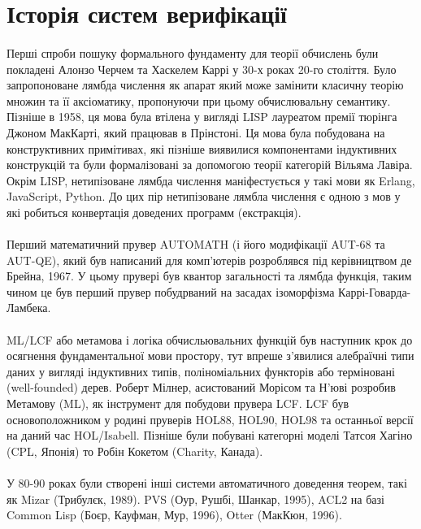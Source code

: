 \section{Історія систем верифікації}

\paragraph{}
Перші спроби пошуку формального фундаменту для теорії обчислень були покладені
Алонзо Черчем та Хаскелем Каррі у 30-х роках 20-го століття. Було запропоноване
лямбда числення як апарат який може замінити класичну теорію множин та її аксіоматику,
пропонуючи при цьому обчислювальну семантику. Пізніше в 1958, ця мова була втілена
у вигляді LISP лауреатом премії тюрінга Джоном МакКарті, який працював в Прінстоні.
Ця мова була побудована на конструктивних примітивах, які пізніше виявилися компонентами
індуктивних конструкцій та були формалізовані за допомогою
теорії категорій Вільяма Лавіра. Окрім LISP, нетипізоване лямбда числення
маніфестується у такі мови як Erlang, JavaScript, Python.
До цих пір нетипізоване лямбла числення є одною з мов у які робиться
конвертація доведених программ (екстракція).

\paragraph{}
Перший математичний прувер AUTOMATH (і його модифікації AUT-68 та AUT-QE),
який був написаний для комп'ютерів розроблявся під керівництвом де Брейна, 1967.
У цьому прувері був квантор загальності та лямбда функція, таким чином це був перший прувер
побудрваний на засадах ізоморфізма Каррі-Говарда-Ламбека.

\paragraph{}
ML/LCF або метамова і логіка обчисльювальних функцій був наступник крок до
осягнення фундаментальної мови простору, тут впреше з'явилися алебраїчні типи даних
у вигляді індуктивних типів, поліноміальних функторів або терміновані (well-founded) дерев.
Роберт Мілнер, асистований Морісом та Н'юві розробив Метамову (ML), як
інструмент для побудови прувера LCF. LCF був основоположником у родині пруверів
HOL88, HOL90, HOL98 та останньої версії на даний час HOL/Isabell.
Пізніше були побувані категорні моделі Татсоя Хагіно (CPL, Японія)
то Робін Кокетом (Charity, Канада).

\paragraph{}
У 80-90 роках були створені інші системи автоматичного доведення теорем,
такі як Mizar (Трибулєк, 1989). PVS (Оур, Рушбі, Шанкар, 1995),
ACL2 на базі Common Lisp (Боєр, Кауфман, Мур, 1996), Otter (МакКюн, 1996).

